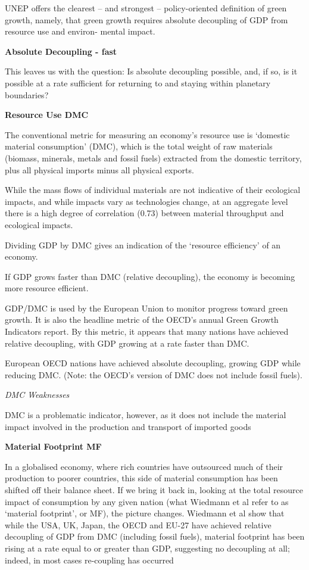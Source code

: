 \documentclass[
]{book}
\begin{document}
UNEP offers the clearest -- and strongest -- policy-oriented definition of green growth,
namely, that green growth requires absolute decoupling of GDP from resource use and environ-
mental impact.

\textbf{Absolute Decoupling - fast}

This leaves us with the question: Is absolute decoupling possible, and, if so, is it possible at a rate
sufficient for returning to and staying within planetary boundaries?

\textbf{Resource Use DMC}

The conventional metric for measuring an economy's resource use is `domestic material consumption'
(DMC), which is the total weight of raw materials (biomass, minerals, metals and fossil fuels) extracted
from the domestic territory, plus all physical imports minus all physical exports.

While the mass flows of individual materials are not indicative of their
ecological impacts, and while impacts vary as technologies change, at an aggregate level there is a
high degree of correlation (0.73) between material throughput and ecological impacts.

Dividing GDP by DMC gives an indication of the `resource efficiency' of an economy.

If GDP grows faster than DMC (relative decoupling), the economy is becoming more resource efficient.

GDP/DMC is used by the European Union to monitor progress toward green growth. It is also the
headline metric of the OECD's annual Green Growth Indicators report.
By this metric, it appears that many nations have achieved relative decoupling, with GDP growing
at a rate faster than DMC.

European OECD nations have achieved absolute decoupling, growing GDP while reducing
DMC. (Note: the OECD's version of DMC does not include fossil fuels).

\emph{DMC Weaknesses}

DMC is a problematic indicator, however, as it does not include the material impact involved in the
production and transport of imported goods

\textbf{Material Footprint MF}

In a globalised economy, where rich countries have outsourced much of their production to poorer
countries, this side of material consumption has been shifted off their balance sheet. If we bring it
back in, looking at the total resource impact of consumption by any given nation (what Wiedmann
et al refer to as `material footprint', or MF), the picture changes. Wiedmann et al show that while the
USA, UK, Japan, the OECD and EU-27 have achieved relative decoupling of GDP from DMC (including
fossil fuels), material footprint has been rising at a rate equal to or greater than GDP, suggesting no
decoupling at all; indeed, in most cases re-coupling has occurred
\end{document}
